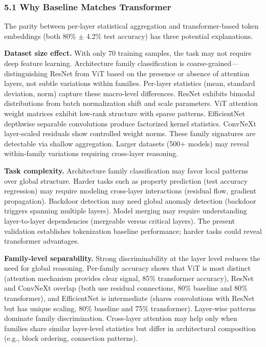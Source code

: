 
\subsubsection{5.1 Why Baseline Matches Transformer}

The parity between per-layer statistical aggregation and transformer-based token embeddings (both 80\% $\pm$ 4.2\% test accuracy) has three potential explanations.

\textbf{Dataset size effect.} With only 70 training samples, the task may not require deep feature learning. Architecture family classification is coarse-grained---distinguishing ResNet from ViT based on the presence or absence of attention layers, not subtle variations within families. Per-layer statistics (mean, standard deviation, norm) capture these macro-level differences. ResNet exhibits bimodal distributions from batch normalization shift and scale parameters. ViT attention weight matrices exhibit low-rank structure with sparse patterns. EfficientNet depthwise separable convolutions produce factorized kernel statistics. ConvNeXt layer-scaled residuals show controlled weight norms. These family signatures are detectable via shallow aggregation. Larger datasets (500+ models) may reveal within-family variations requiring cross-layer reasoning.

\textbf{Task complexity.} Architecture family classification may favor local patterns over global structure. Harder tasks such as property prediction (test accuracy regression) may require modeling cross-layer interactions (residual flow, gradient propagation). Backdoor detection may need global anomaly detection (backdoor triggers spanning multiple layers). Model merging may require understanding layer-to-layer dependencies (mergeable versus critical layers). The present validation establishes tokenization baseline performance; harder tasks could reveal transformer advantages.

\textbf{Family-level separability.} Strong discriminability at the layer level reduces the need for global reasoning. Per-family accuracy shows that ViT is most distinct (attention mechanism provides clear signal, 85\% transformer accuracy), ResNet and ConvNeXt overlap (both use residual connections, 80\% baseline and 80\% transformer), and EfficientNet is intermediate (shares convolutions with ResNet but has unique scaling, 80\% baseline and 75\% transformer). Layer-wise patterns dominate family discrimination. Cross-layer attention may help only when families share similar layer-level statistics but differ in architectural composition (e.g., block ordering, connection patterns).

